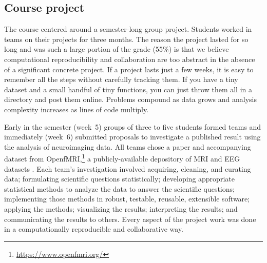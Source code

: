 \subsection{Course project}\label{project}

The course centered around a semester-long group project.
Students worked in teams on their projects for three months.
The reason the project lasted for so long and was such a large portion of the grade (55\%)
is that we believe computational reproducibility and collaboration
are too abstract in the absence of a significant concrete project.
If a project lasts just a few weeks, it is easy to remember all the steps
without carefully tracking them.
If you have a tiny dataset and a small handful of tiny functions, you can just
throw them all in a directory and post them online.
Problems compound as data grows and analysis complexity increases as lines of
code multiply.


Early in the semester (week~5) groups of three to five students formed teams
and immediately (week~6) submitted proposals to investigate
a published result using the analysis of neuroimaging data.
All teams chose a paper and accompanying dataset from
OpenfMRI,\footnote{\url{https://www.openfmri.org/}} a publicly-available
depository of MRI and EEG datasets
\citep{poldrack2013toward,poldrack2015openfmri}.
Each team's investigation involved
acquiring, cleaning, and curating data;
formulating scientific questions statistically;
developing appropriate statistical methods
to analyze the data to answer the scientific questions;
implementing those methods in robust, testable, reusable, extensible software;
applying the methods;
visualizing the results;
interpreting the results;
and communicating the results to others.
Every aspect of the project work was done in a computationally reproducible
and collaborative way.

